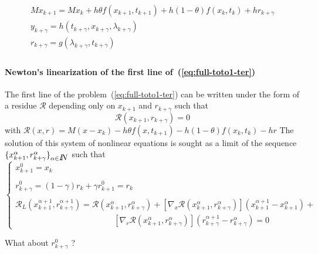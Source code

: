 
  \begin{equation}
    \begin{array}{l}
      \label{eq:full-toto1-ter}
      M x_{k+1} = M x_{k} +h \theta f(x_{k+1},t_{k+1}) +h(1-\theta)f(x_{k},t_{k}) + h r_{k+\gamma} \\[2mm]
      y_{k+\gamma} =  h(t_{k+\gamma},x_{k+\gamma},\lambda _{k+\gamma}) \\[2mm]
      r_{k+\gamma} = g(\lambda_{k+\gamma},t_{k+\gamma})\\[2mm]
    \end{array}
\end{equation}

 \paragraph{Newton's linearization of the first line of~(\ref{eq:full-toto1-ter})} The first line of the  problem~(\ref{eq:full-toto1-ter}) can be written under the form of a residue $\mathcal R$ depending only on $x_{k+1}$ and $r_{k+\gamma}$ such that 
\begin{equation}
  \label{eq:full-NL3}
  \mathcal R (x_{k+1},r _{k+\gamma}) =0
\end{equation}
with $\mathcal R(x,r) = M(x - x_{k}) -h\theta f( x , t_{k+1}) - h(1-\theta)f(x_k,t_k) - h r $
The solution of this system of nonlinear equations is sought as a limit of the sequence $\{ x^{\alpha}_{k+1},r^{\alpha}_{k+\gamma} \}_{\alpha \in \mbox{\rm $I\!\!N$}}$ such that
 \begin{equation}
   \label{eq:full-NL7}
   \begin{cases}
     x^{0}_{k+1} = x_k \\ \\
     r^{0}_{k+\gamma} = (1-\gamma ) r_{k} + \gamma r^0_{k+1}  = r_k \\ \\     
     \mathcal R_L( x^{\alpha+1}_{k+1},r^{\alpha+1}_{k+\gamma}) = \mathcal
     R(x^{\alpha}_{k+1},r^{\alpha}_{k+\gamma})  + \left[ \nabla_{x} \mathcal
     R(x^{\alpha}_{k+1},r^{\alpha}_{k+\gamma})\right] (x^{\alpha+1}_{k+1}-x^{\alpha}_{k+1} ) + \\[2mm]
     \qquad\qquad\qquad\qquad\qquad\qquad\left[ \nabla_{r} \mathcal R(x^{\alpha}_{k+1},r^{\alpha}_{k+\gamma})\right] (r^{\alpha+1}_{k+\gamma} - r^{\alpha}_{k+\gamma} ) =0
 \end{cases}
\end{equation}
\begin{ndrva}
  What about $r^0_{k+\gamma}$ ?
\end{ndrva}

